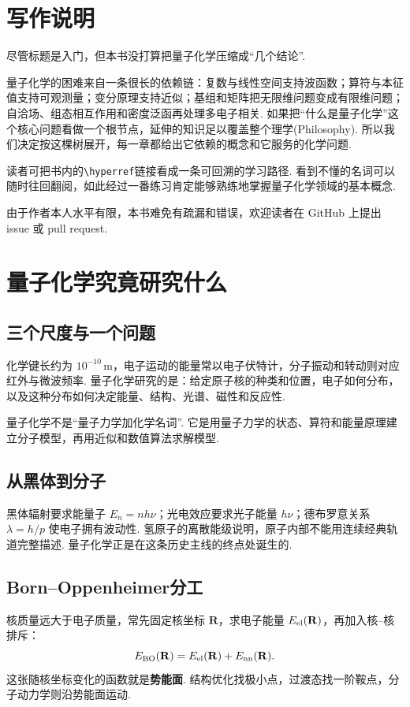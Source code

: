 \documentclass[UTF8,11pt,a4paper,openany]{ctexbook}
\newcommand{\term}[1]{\textbf{#1}}
\begin{document}
\frontmatter


\chapter*{写作说明}
尽管标题是入门，但本书没打算把量子化学压缩成“几个结论”. 

量子化学的困难来自一条很长的依赖链：复数与线性空间支持波函数；算符与本征值支持可观测量；变分原理支持近似；基组和矩阵把无限维问题变成有限维问题；自洽场、组态相互作用和密度泛函再处理多电子相关. 如果把“什么是量子化学”这个核心问题看做一个根节点，延伸的知识足以覆盖整个理学(Philosophy). 所以我们决定按这棵树展开，每一章都给出它依赖的概念和它服务的化学问题. 

读者可把书内的\texttt{\textbackslash hyperref}链接看成一条可回溯的学习路径. 看到不懂的名词可以随时往回翻阅，如此经过一番练习肯定能够熟练地掌握量子化学领域的基本概念. 

由于作者本人水平有限，本书难免有疏漏和错误，欢迎读者在 GitHub 上提出 issue 或 pull request. 

\tableofcontents
\mainmatter

\chapter{量子化学究竟研究什么}
\section{三个尺度与一个问题}
化学键长约为 $10^{-10}\,\mathrm m$，电子运动的能量常以电子伏特计，分子振动和转动则对应红外与微波频率. 量子化学研究的是：给定原子核的种类和位置，电子如何分布，以及这种分布如何决定能量、结构、光谱、磁性和反应性. 
\begin{definitionbox}量子化学不是“量子力学加化学名词”. 它是用量子力学的状态、算符和能量原理建立分子模型，再用近似和数值算法求解模型. \end{definitionbox}
\section{从黑体到分子}
黑体辐射要求能量子 $E_n=nh\nu$；光电效应要求光子能量 $h\nu$；德布罗意关系 $\lambda=h/p$ 使电子拥有波动性. 氢原子的离散能级说明，原子内部不能用连续经典轨道完整描述. 量子化学正是在这条历史主线的终点处诞生的. 
\section{Born--Oppenheimer分工}
核质量远大于电子质量，常先固定核坐标 $\mathbf R$，求电子能量 $E_{\rm el}(\mathbf R)$，再加入核--核排斥：
\[
E_{\rm BO}(\mathbf R)=E_{\rm el}(\mathbf R)+E_{\rm nn}(\mathbf R).
\]
这张随核坐标变化的函数就是\term{势能面}. 结构优化找极小点，过渡态找一阶鞍点，分子动力学则沿势能面运动. 
\end{document}
